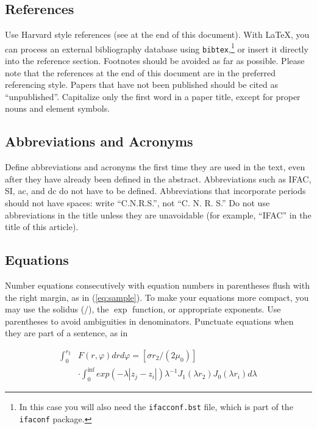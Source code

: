 \documentclass{ifacconf}
\begin{document}
\subsection{References}

Use Harvard style references (see at the end of this document). With
\LaTeX, you can process an external bibliography database 
using \texttt{bibtex},\footnote{In this case you will also need the \texttt{ifacconf.bst}
file, which is part of the \texttt{ifaconf} package.}
or insert it directly into the reference section. Footnotes should be avoided as
far as possible.  Please note that the references at the end of this
document are in the preferred referencing style. Papers that have not
been published should be cited as ``unpublished''.  Capitalize only the
first word in a paper title, except for proper nouns and element
symbols.

\subsection{Abbreviations and Acronyms}

Define abbreviations and acronyms the first time they are used in the
text, even after they have already been defined in the
abstract. Abbreviations such as IFAC, SI, ac, and dc do not have to be
defined. Abbreviations that incorporate periods should not have
spaces: write ``C.N.R.S.'', not ``C. N. R. S.'' Do not use abbreviations
in the title unless they are unavoidable (for example, ``IFAC'' in the
title of this article).

\subsection{Equations}

Number equations consecutively with equation numbers in parentheses
flush with the right margin, as in (\ref{eq:sample}).  To make your equations more
compact, you may use the solidus ($/$), the $\exp$ function, or
appropriate exponents. Use parentheses to avoid ambiguities in
denominators. Punctuate equations when they are part of a sentence, as
in

\begin{equation} \label{eq:sample2}
\begin{array}{ll}
\int_0^{r_2} & F (r, \varphi ) dr d\varphi = [\sigma r_2 / (2 \mu_0 )] \\
& \cdot \int_0^{\inf} exp(-\lambda |z_j - z_i |) \lambda^{-1} J_1 (\lambda  r_2 ) J_0 (\lambda r_i ) d\lambda 
\end{array}
\end{equation}
\end{document}

